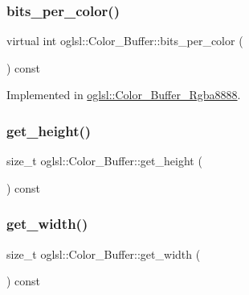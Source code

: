 \subsubsection{\texorpdfstring{bits\+\_\+per\+\_\+color()}{bits\_per\_color()}}
{\footnotesize\ttfamily virtual int oglsl\+::\+Color\+\_\+\+Buffer\+::bits\+\_\+per\+\_\+color (\begin{DoxyParamCaption}{ }\end{DoxyParamCaption}) const\hspace{0.3cm}{\ttfamily [pure virtual]}}



Implemented in \mbox{\hyperlink{classoglsl_1_1_color___buffer___rgba8888_a3b4da4899c6765e8689ec2b438ecba84}{oglsl\+::\+Color\+\_\+\+Buffer\+\_\+\+Rgba8888}}.

\mbox{\label{classoglsl_1_1_color___buffer_ae13e503d22d65745da0c8c83fb024e5c}} 
\subsubsection{\texorpdfstring{get\+\_\+height()}{get\_height()}}
{\footnotesize\ttfamily size\+\_\+t oglsl\+::\+Color\+\_\+\+Buffer\+::get\+\_\+height (\begin{DoxyParamCaption}{ }\end{DoxyParamCaption}) const\hspace{0.3cm}{\ttfamily [inline]}}

\mbox{\label{classoglsl_1_1_color___buffer_ad8f3838322c9e15aa4ebe0f687f0c482}} 
\subsubsection{\texorpdfstring{get\+\_\+width()}{get\_width()}}
{\footnotesize\ttfamily size\+\_\+t oglsl\+::\+Color\+\_\+\+Buffer\+::get\+\_\+width (\begin{DoxyParamCaption}{ }\end{DoxyParamCaption}) const\hspace{0.3cm}{\ttfamily [inline]}}

